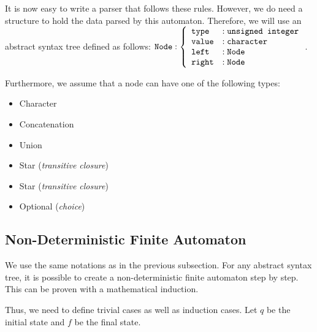 \documentclass[a4paper,11pt,titlepage]{article}
\begin{document}
It is now easy to write a parser that follows these rules. However, we do need a structure to hold the data parsed by this automaton. Therefore, we will use an abstract syntax tree defined as follows: $\verb|Node| : \left\{\begin{array}{ll}
    \verb|type| &:\verb|unsigned integer|\\
    \verb|value| &:\verb|character|\\
    \verb|left| &:\verb|Node|\\
    \verb|right| &:\verb|Node|
\end{array}\right.$. 

Furthermore, we assume that a node can have one of the following types:
\begin{itemize}
    \item Character
    \item Concatenation
    \item Union
    \item Star (\textit{transitive closure})
    \item Star (\textit{transitive closure})
    \item Optional (\textit{choice})
\end{itemize}

\subsection{Non-Deterministic Finite Automaton}
We use the same notations as in the previous subsection. For any abstract syntax tree, it is possible to create a non-deterministic finite automaton step by step. This can be proven with a mathematical induction.

Thus, we need to define trivial cases as well as induction cases. Let $q$ be the initial state and $f$ be the final state.
\end{document}
